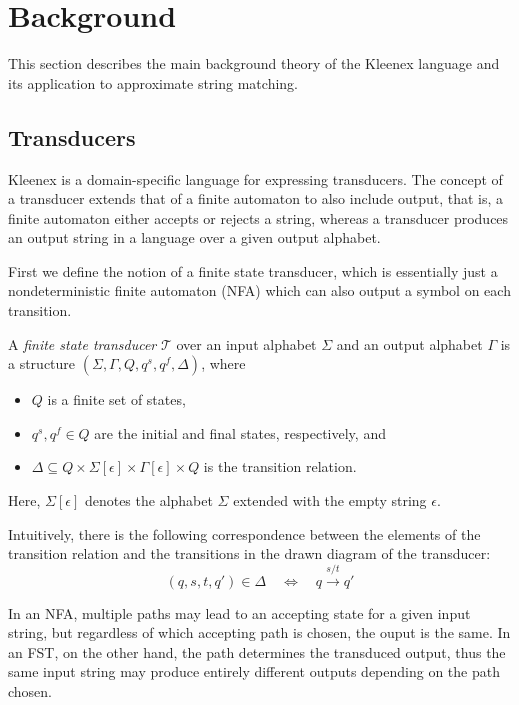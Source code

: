 \section{Background}

This section describes the main background theory of the Kleenex language and
its application to approximate string matching.

\subsection{Transducers}

Kleenex is a domain-specific language for expressing transducers. The concept
of a transducer extends that of a finite automaton to also include output, that
is, a finite automaton either accepts or rejects a string, whereas a transducer
produces an output string in a language over a given output alphabet.

First we define the notion of a finite state transducer, which is essentially
just a nondeterministic finite automaton (NFA) which can also output a symbol
on each transition.

\begin{definition}[FST]
  A \emph{finite state transducer} $\mathcal{T}$ over an input alphabet
  $\Sigma$ and an output alphabet $\Gamma$ is a structure
  $(\Sigma, \Gamma, Q, q^s, q^f, \Delta)$, where
  \begin{itemize}
      \item $Q$ is a finite set of states,
      \item $q^s, q^f \in Q$ are the initial and final states,
        respectively, and
      \item $\Delta \subseteq Q \times \Sigma[\epsilon] \times
        \Gamma[\epsilon] \times Q$ is the transition relation.
  \end{itemize}
\end{definition}

Here, $\Sigma[\epsilon]$ denotes the alphabet $\Sigma$ extended with the empty
string $\epsilon$.

Intuitively, there is the following correspondence between the elements of the
transition relation and the transitions in the drawn diagram of the transducer:
\[
  (q, s, t, q') \in \Delta \quad \Leftrightarrow \quad q \xrightarrow{s/t} q'
\]

In an NFA, multiple paths may lead to an accepting state for a given input
string, but regardless of which accepting path is chosen, the ouput is the
same. In an FST, on the other hand, the path determines the transduced output,
thus the same input string may produce entirely different outputs depending on
the path chosen.

